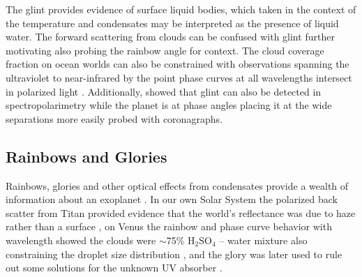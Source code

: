 \documentclass[
    usenatbib,
]{mnras}
\begin{document}
The glint provides evidence of surface liquid bodies, which taken in the context of the temperature and condensates may be interpreted as the presence of liquid water.
%
The forward scattering from clouds can be confused with glint \citep{Robinson_2010} further motivating also probing the rainbow angle for context.
%
The cloud coverage fraction on ocean worlds can also be constrained with observations spanning the ultraviolet to near-infrared by the point phase curves at all wavelengths intersect in polarized light \citep{treesandstam2019}.
%
Additionally, \citet{trees2022} showed that glint can also be detected in spectropolarimetry while the planet is at phase angles placing it at the wide separations more easily probed with coronagraphs.



\subsection{Rainbows and Glories}

Rainbows, glories and other optical effects from condensates provide a wealth of information about an exoplanet \citep{karalidi2012rainbow, stam2008}.
%
In our own Solar System the polarized back scatter from Titan provided evidence that the world's reflectance was due to haze rather than a surface \citep{zellner1973polarization}, on Venus the rainbow and phase curve behavior with wavelength showed the clouds were $\sim$75\% H$_2$SO$_4$ -- water mixture also constraining the droplet size distribution \citep{hansenhovenier1974}, and the glory was later used to rule out some solutions for the unknown UV absorber \citep{petrova2018glory}.
\end{document}
